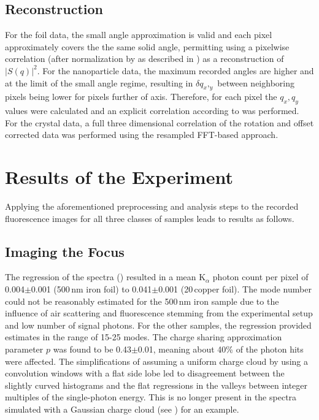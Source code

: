 \subsection{Reconstruction}
For the foil data, the small angle approximation is valid and each pixel approximately covers the the same solid angle, permitting using a pixelwise correlation (after normalization by as described in ) as a reconstruction of $|S(q)|^2$.
For the nanoparticle data, the maximum recorded angles are higher and at the limit of the small angle regime, resulting in $\delta q_x,_y$ between neighboring pixels being lower for pixels further of axis. Therefore, for each pixel the $q_x,q_y$ values were calculated and an explicit correlation according to  was performed.
For the crystal data, a full three dimensional correlation of the rotation and offset corrected data was performed using the resampled FFT-based approach.


\section{Results of the Experiment}
Applying the aforementioned preprocessing and analysis steps to the recorded fluorescence images for all three classes of samples leads to results as follows. 
\subsection{Imaging the Focus}

The regression of the spectra () resulted in a mean K$_{\alpha}$ photon count per pixel of 0.004$\pm$0.001 (500\,nm iron foil) to 0.041$\pm$0.001 (20\,\micrometer copper foil). The mode number could not be reasonably estimated for the 500\,nm iron sample due to the influence of air scattering and fluorescence stemming from the experimental setup and low number of signal photons. For the other samples, the regression provided estimates in the range of 15-25 modes. The charge sharing approximation parameter $p$ was found to be 0.43$\pm$0.01, meaning about 40\% of the photon hits were affected. The simplifications of assuming a uniform charge cloud by using a convolution windows with a flat side lobe led to disagreement between the slightly curved histograms and the flat regressions in the valleys between integer multiples of the single-photon energy. This is no longer present in the spectra simulated with a Gaussian charge cloud (see ) for an example.

